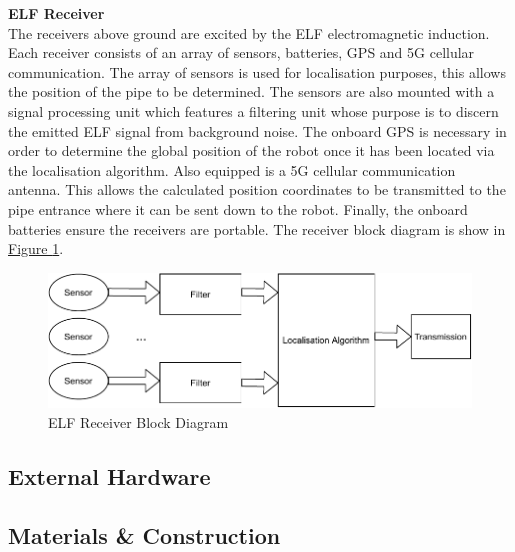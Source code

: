 \documentclass[11pt]{article}		%
\newlength{\imageheight}	 %
\newcommand{\figref}[1]{\hyperref[#1]{Figure \ref*{#1}}}    %
\begin{document}
			\textbf{ELF Receiver}\\
			The receivers above ground are excited by the ELF electromagnetic induction. Each receiver consists of an array of sensors, batteries, GPS and 5G cellular communication. The array of sensors is used for localisation purposes, this allows the position of the pipe to be determined. The sensors are also mounted with a signal processing unit which features a filtering unit whose purpose is to discern the emitted ELF signal from background noise. The onboard GPS is necessary in order to determine the global position of the robot once it has been located via the localisation algorithm. Also equipped is a 5G cellular communication antenna. This allows the calculated position coordinates to be transmitted to the pipe entrance where it can be sent down to the robot.  Finally, the onboard batteries ensure the receivers are portable. The receiver block diagram is show in \figref{ELFrec}.
		    
		    \begin{figure}[h]
				\centering
				\includegraphics[height=\imageheight]{blockreceiever.pdf}
				\caption{ELF Receiver Block Diagram}
				\label{ELFrec}
			\end{figure}
	
		\subsection{External Hardware}
		
		
	
		\subsection{Materials \& Construction}
		
\end{document}
